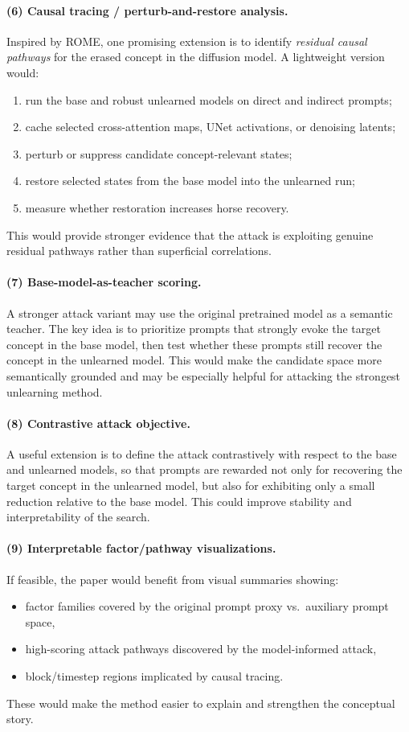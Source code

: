 \paragraph{(6) Causal tracing / perturb-and-restore analysis.}
Inspired by ROME, one promising extension is to identify \emph{residual causal pathways} for the erased concept in the diffusion model. A lightweight version would:
\begin{enumerate}
    \item run the base and robust unlearned models on direct and indirect prompts;
    \item cache selected cross-attention maps, UNet activations, or denoising latents;
    \item perturb or suppress candidate concept-relevant states;
    \item restore selected states from the base model into the unlearned run;
    \item measure whether restoration increases horse recovery.
\end{enumerate}
This would provide stronger evidence that the attack is exploiting genuine residual pathways rather than superficial correlations.

\paragraph{(7) Base-model-as-teacher scoring.}
A stronger attack variant may use the original pretrained model as a semantic teacher. The key idea is to prioritize prompts that strongly evoke the target concept in the base model, then test whether these prompts still recover the concept in the unlearned model. This would make the candidate space more semantically grounded and may be especially helpful for attacking the strongest unlearning method.

\paragraph{(8) Contrastive attack objective.}
A useful extension is to define the attack contrastively with respect to the base and unlearned models, so that prompts are rewarded not only for recovering the target concept in the unlearned model, but also for exhibiting only a small reduction relative to the base model. This could improve stability and interpretability of the search.

\paragraph{(9) Interpretable factor/pathway visualizations.}
If feasible, the paper would benefit from visual summaries showing:
\begin{itemize}
    \item factor families covered by the original prompt proxy vs.\ auxiliary prompt space,
    \item high-scoring attack pathways discovered by the model-informed attack,
    \item block/timestep regions implicated by causal tracing.
\end{itemize}
These would make the method easier to explain and strengthen the conceptual story.

